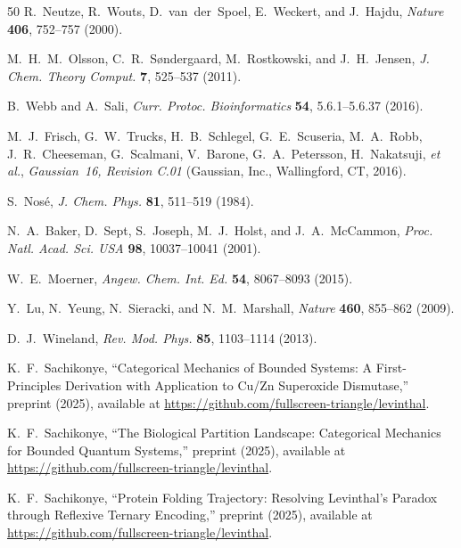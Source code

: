\documentclass[twocolumn,10pt]{article}
\begin{document}
\begin{thebibliography}{50}
R.~Neutze, R.~Wouts, D.~van~der~Spoel, E.~Weckert, and J.~Hajdu,
\textit{Nature} \textbf{406}, 752--757 (2000).


M.~H.~M.~Olsson, C.~R.~S{\o}ndergaard, M.~Rostkowski, and J.~H.~Jensen,
\textit{J. Chem. Theory Comput.} \textbf{7}, 525--537 (2011).

B.~Webb and A.~Sali,
\textit{Curr. Protoc. Bioinformatics} \textbf{54}, 5.6.1--5.6.37 (2016).

M.~J.~Frisch, G.~W.~Trucks, H.~B.~Schlegel, G.~E.~Scuseria,
M.~A.~Robb, J.~R.~Cheeseman, G.~Scalmani, V.~Barone,
G.~A.~Petersson, H.~Nakatsuji, \textit{et al.},
\textit{Gaussian~16, Revision C.01} (Gaussian, Inc., Wallingford, CT, 2016).

S.~Nos\'{e},
\textit{J. Chem. Phys.} \textbf{81}, 511--519 (1984).

N.~A.~Baker, D.~Sept, S.~Joseph, M.~J.~Holst, and J.~A.~McCammon,
\textit{Proc. Natl. Acad. Sci. USA} \textbf{98}, 10037--10041 (2001).


W.~E.~Moerner,
\textit{Angew. Chem. Int. Ed.} \textbf{54}, 8067--8093 (2015).

Y.~Lu, N.~Yeung, N.~Sieracki, and N.~M.~Marshall,
\textit{Nature} \textbf{460}, 855--862 (2009).

D.~J.~Wineland,
\textit{Rev. Mod. Phys.} \textbf{85}, 1103--1114 (2013).


K.~F.~Sachikonye,
``Categorical Mechanics of Bounded Systems: A First-Principles Derivation
with Application to Cu/Zn Superoxide Dismutase,''
preprint (2025), available at
\url{https://github.com/fullscreen-triangle/levinthal}.

K.~F.~Sachikonye,
``The Biological Partition Landscape: Categorical Mechanics for
Bounded Quantum Systems,''
preprint (2025), available at
\url{https://github.com/fullscreen-triangle/levinthal}.

K.~F.~Sachikonye,
``Protein Folding Trajectory: Resolving Levinthal's Paradox through
Reflexive Ternary Encoding,''
preprint (2025), available at
\url{https://github.com/fullscreen-triangle/levinthal}.

\end{thebibliography}
\end{document}
